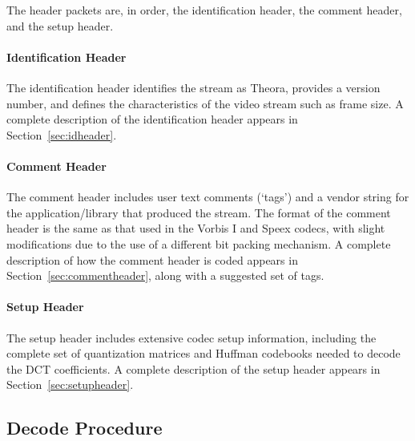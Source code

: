 \documentclass[11pt,letterpaper]{book}
\numberwithin{equation}{chapter}
\numberwithin{figure}{chapter}
\numberwithin{table}{chapter}
\begin{document}
The header packets are, in order, the identification header, the comment
 header, and the setup header.

\paragraph{Identification Header}

The identification header identifies the stream as Theora, provides a version
 number, and defines the characteristics of the video stream such as frame
 size.
A complete description of the identification header appears in
 Section~\ref{sec:idheader}.

\paragraph{Comment Header}

The comment header includes user text comments (`tags') and a vendor string
 for the application/library that produced the stream.
The format of the comment header is the same as that used in the Vorbis I and
 Speex codecs, with slight modifications due to the use of a different bit
 packing mechanism.
A complete description of how the comment header is coded appears in
 Section~\ref{sec:commentheader}, along with a suggested set of tags.

\paragraph{Setup Header}

The setup header includes extensive codec setup information, including the
 complete set of quantization matrices and Huffman codebooks needed to decode
 the DCT coefficients.
A complete description of the setup header appears in
 Section~\ref{sec:setupheader}.

\subsection{Decode Procedure}
\end{document}
